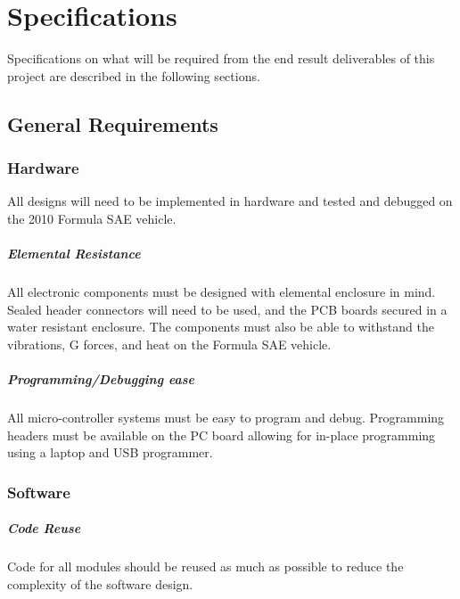 %
%
%
%

\chapter{Specifications}

Specifications on what will be required from the end result deliverables of this project are described in the following sections.

\section{General Requirements}

\subsection{Hardware}
All designs will need to be implemented in hardware and tested and debugged on the 2010 Formula SAE vehicle.

\paragraph{Elemental Resistance}
All electronic components must be designed with elemental enclosure in mind. Sealed header connectors will need to be used, and the PCB boards secured in a water resistant enclosure. The components must also be able to withstand the vibrations, G forces, and heat on the Formula SAE vehicle.

\paragraph{Programming/Debugging ease}
All micro-controller systems must be easy to program and debug. Programming headers must be available on the PC board allowing for in-place programming using a laptop and USB programmer.

\subsection{Software}

\paragraph{Code Reuse}
Code for all modules should be reused as much as possible to reduce the complexity of the software design.


